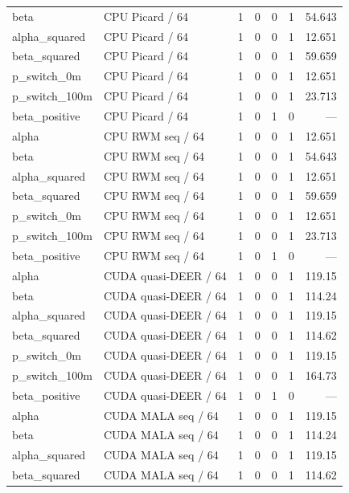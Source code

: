 \documentclass[UTF8,fontset=fandol,a4paper]{ctexart}
\begin{document}
\begin{longtable}{P{28mm}P{40mm}rrrrr}
beta & CPU Picard / 64 & 1 & 0 & 0 & 1 & 54.643 \\
alpha\_\allowbreak{}squared & CPU Picard / 64 & 1 & 0 & 0 & 1 & 12.651 \\
beta\_\allowbreak{}squared & CPU Picard / 64 & 1 & 0 & 0 & 1 & 59.659 \\
p\_\allowbreak{}switch\_\allowbreak{}0m & CPU Picard / 64 & 1 & 0 & 0 & 1 & 12.651 \\
p\_\allowbreak{}switch\_\allowbreak{}100m & CPU Picard / 64 & 1 & 0 & 0 & 1 & 23.713 \\
beta\_\allowbreak{}positive & CPU Picard / 64 & 1 & 0 & 1 & 0 & — \\
alpha & CPU RWM seq / 64 & 1 & 0 & 0 & 1 & 12.651 \\
beta & CPU RWM seq / 64 & 1 & 0 & 0 & 1 & 54.643 \\
alpha\_\allowbreak{}squared & CPU RWM seq / 64 & 1 & 0 & 0 & 1 & 12.651 \\
beta\_\allowbreak{}squared & CPU RWM seq / 64 & 1 & 0 & 0 & 1 & 59.659 \\
p\_\allowbreak{}switch\_\allowbreak{}0m & CPU RWM seq / 64 & 1 & 0 & 0 & 1 & 12.651 \\
p\_\allowbreak{}switch\_\allowbreak{}100m & CPU RWM seq / 64 & 1 & 0 & 0 & 1 & 23.713 \\
beta\_\allowbreak{}positive & CPU RWM seq / 64 & 1 & 0 & 1 & 0 & — \\
alpha & CUDA quasi-DEER / 64 & 1 & 0 & 0 & 1 & 119.15 \\
beta & CUDA quasi-DEER / 64 & 1 & 0 & 0 & 1 & 114.24 \\
alpha\_\allowbreak{}squared & CUDA quasi-DEER / 64 & 1 & 0 & 0 & 1 & 119.15 \\
beta\_\allowbreak{}squared & CUDA quasi-DEER / 64 & 1 & 0 & 0 & 1 & 114.62 \\
p\_\allowbreak{}switch\_\allowbreak{}0m & CUDA quasi-DEER / 64 & 1 & 0 & 0 & 1 & 119.15 \\
p\_\allowbreak{}switch\_\allowbreak{}100m & CUDA quasi-DEER / 64 & 1 & 0 & 0 & 1 & 164.73 \\
beta\_\allowbreak{}positive & CUDA quasi-DEER / 64 & 1 & 0 & 1 & 0 & — \\
alpha & CUDA MALA seq / 64 & 1 & 0 & 0 & 1 & 119.15 \\
beta & CUDA MALA seq / 64 & 1 & 0 & 0 & 1 & 114.24 \\
alpha\_\allowbreak{}squared & CUDA MALA seq / 64 & 1 & 0 & 0 & 1 & 119.15 \\
beta\_\allowbreak{}squared & CUDA MALA seq / 64 & 1 & 0 & 0 & 1 & 114.62 \\

\end{longtable}
\end{document}

